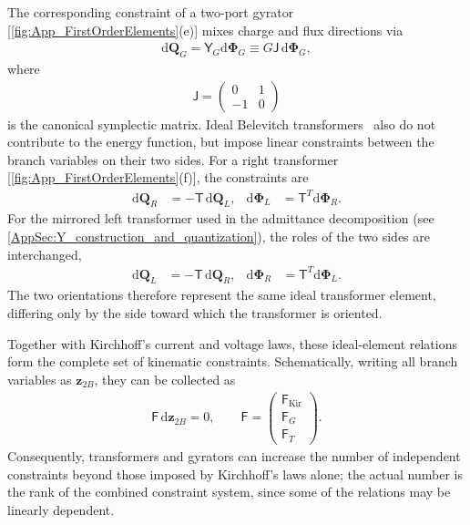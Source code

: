 \documentclass[prx,aps,twocolumn,article]{revtex4-2}
\newcommand{\msf}[1]{\mathsf{#1}}
\newcommand{\bsb}[1]{\boldsymbol{#1}}
\newcommand{\bPhi}{\bsb{\Phi}}
\newcommand{\bQ}{\bsb{Q}}
\newcommand{\msT}{\msf{T}}
\newcommand{\msY}{\msf{Y}}
\newcommand{\msF}{\msf{F}}
\begin{document}
The corresponding constraint of a two-port gyrator~\cite{Tellegen:1948} [\cref{fig:App_FirstOrderElements}(e)] mixes charge and flux directions via
\begin{align}
    \mathrm{d}\bQ_G
    =\msY_G\mathrm{d}\bPhi_G\equiv
    G\msf{J}\,
    \mathrm{d}\bPhi_G,
    \label{Eq:AppGyratorConstraint}
\end{align}
where 
\begin{align}
    \msf{J}
    =
    \begin{pmatrix}
        0 & 1\\
        -1 & 0
    \end{pmatrix}
\end{align}
is the canonical symplectic matrix. Ideal Belevitch transformers~\cite{Belevitch:1950} also do not contribute to the energy function, but impose linear constraints between the branch variables on their two sides. For a right transformer [\cref{fig:App_FirstOrderElements}(f)], the constraints are
\begin{align}
    \mathrm{d}\bQ_R
    &=
    -\msT\,
    \mathrm{d}\bQ_L,
    &
    \mathrm{d}\bPhi_L
    &=
    \msT^T
    \mathrm{d}\bPhi_R.
    \label{Eq:AppRightTransformerConstraint}
\end{align}
For the mirrored left transformer used in the admittance decomposition (see \cref{AppSec:Y_construction_and_quantization}), the roles of the two sides are
interchanged,
\begin{align}
    \mathrm{d}\bQ_L
    &=
    -\msT\,
    \mathrm{d}\bQ_R,
    &
    \mathrm{d}\bPhi_R
    &=
    \msT^T
    \mathrm{d}\bPhi_L.
    \label{Eq:AppLeftTransformerConstraint}
\end{align}
The two orientations therefore represent the same ideal transformer
element, differing only by the side toward which the transformer is
oriented.

Together with Kirchhoff's current and voltage laws, these ideal-element relations form the complete set of kinematic constraints. Schematically, writing all branch variables as $\bsb{z}_{2B}$, they can be collected as
\begin{align}
    \msF\,
    \mathrm{d}\bsb{z}_{2B}
    =
    0,
    \qquad
    \msF
    =
    \begin{pmatrix}
        \msF_{\mathrm{Kir}}\\
        \msF_G\\
        \msF_T
    \end{pmatrix}.
    \label{Eq:AppTotalPfaffConstraints}
\end{align}
Consequently, transformers and gyrators can increase the number of
independent constraints beyond those imposed by Kirchhoff's laws
alone; the actual number is the rank of the combined constraint
system, since some of the relations may be linearly dependent.
\end{document}
